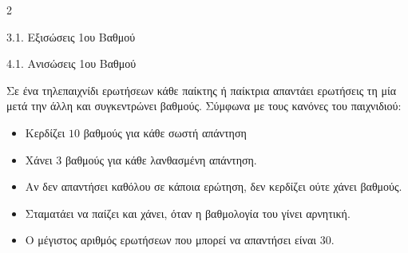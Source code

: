 \begin{ylh}{2}
    \item 3.1. Εξισώσεις 1ου Βαθμού
    \item 4.1. Ανισώσεις 1ου Βαθμού
\end{ylh}
Σε ένα τηλεπαιχνίδι ερωτήσεων κάθε παίκτης ή παίκτρια απαντάει ερωτήσεις τη μία μετά την άλλη και συγκεντρώνει βαθμούς. Σύμφωνα με τους κανόνες του παιχνιδιού:

\begin{itemize}
\item
  Κερδίζει $10$ βαθμούς για κάθε σωστή απάντηση
\item
  Χάνει $3$ βαθμούς για κάθε λανθασμένη απάντηση.
\item
  Αν δεν απαντήσει καθόλου σε κάποια ερώτηση, δεν κερδίζει ούτε χάνει βαθμούς.
\item
  Σταματάει να παίζει και χάνει, όταν η βαθμολογία του γίνει αρνητική.
\item
  Ο μέγιστος αριθμός ερωτήσεων που μπορεί να απαντήσει είναι $30$.
\end{itemize}

